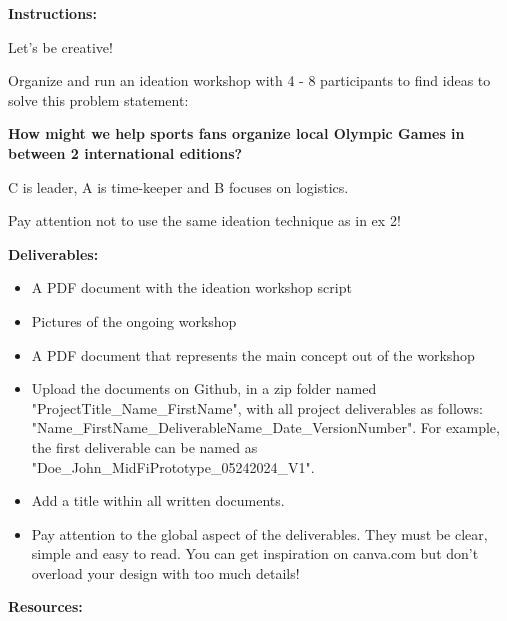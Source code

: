 \makeheaderfiles

\textbf{Instructions:}

Let's be creative!

Organize and run an ideation workshop with 4 - 8 participants to find ideas to solve this problem statement:

\textbf{How might we help sports fans organize local Olympic Games in between 2 international editions?}

C is leader, A is time-keeper and B focuses on logistics.

Pay attention not to use the same ideation technique as in ex 2!

\textbf{Deliverables:}

\begin{itemize}
\item A PDF document with the ideation workshop script
\item Pictures of the ongoing workshop
\item A PDF document that represents the main concept out of the workshop
\item Upload the documents on Github, in a zip folder named "ProjectTitle\_Name\_FirstName", with all project deliverables as follows: "Name\_FirstName\_DeliverableName\_Date\_VersionNumber".  For example, the first deliverable can be named as "Doe\_John\_MidFiPrototype\_05242024\_V1".
\item Add a title within all written documents.
\item Pay attention to the global aspect of the deliverables. They must be clear, simple and easy to read. You can get inspiration on canva.com but don't overload your design with too much details!
\end{itemize}

\textbf{Resources:}


